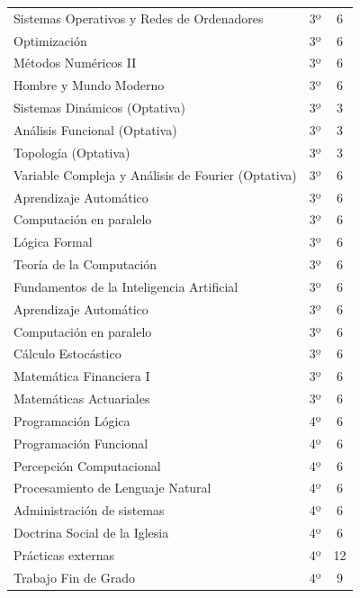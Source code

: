 \begin{longtable}[c]{lcc}
Sistemas Operativos y Redes de Ordenadores & 3º & 6 \\
Optimización & 3º & 6 \\
Métodos Numéricos II & 3º & 6 \\
Hombre y Mundo Moderno & 3º & 6 \\

Sistemas Dinámicos (Optativa) & 3º & 3 \\
Análisis Funcional (Optativa) & 3º & 3 \\
Topología (Optativa) & 3º & 3 \\
Variable Compleja y Análisis de Fourier (Optativa) & 3º & 6 \\

Aprendizaje Automático & 3º & 6 \\
Computación en paralelo & 3º & 6 \\
Lógica Formal & 3º & 6 \\
Teoría de la Computación & 3º & 6 \\
Fundamentos de la Inteligencia Artificial & 3º & 6 \\

Aprendizaje Automático & 3º & 6 \\
Computación en paralelo & 3º & 6 \\
Cálculo Estocástico & 3º & 6 \\
Matemática Financiera I & 3º & 6 \\
Matemáticas Actuariales & 3º & 6 \\

Programación Lógica & 4º & 6 \\
Programación Funcional & 4º & 6 \\
Percepción Computacional & 4º & 6 \\
Procesamiento de Lenguaje Natural & 4º & 6 \\
Administración de sistemas & 4º & 6 \\

Doctrina Social de la Iglesia & 4º & 6 \\
Prácticas externas & 4º & 12 \\
Trabajo Fin de Grado & 4º & 9 \\


\end{longtable}

